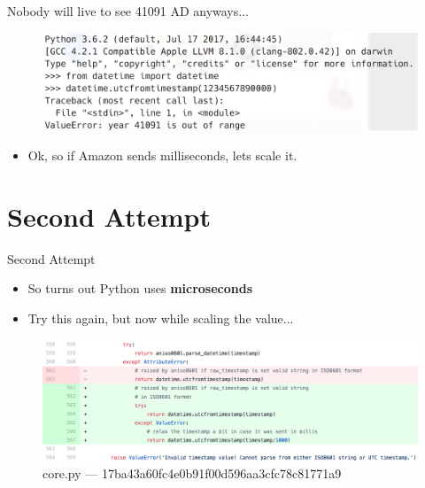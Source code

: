 \documentclass[10pt]{beamer}
\begin{document}
\begin{frame}{Nobody will live to see 41091 AD anyways...}
	\begin{figure}
		\centering
		\includegraphics[width=\textwidth]{images/valueerror.png}
	\end{figure}
	\begin{itemize}
		\item Ok, so if Amazon sends milliseconds, lets scale it.
	\end{itemize}
\end{frame}

\section{Second Attempt}
\begin{frame}{Second Attempt}
	\begin{itemize}
		\item So turns out Python uses \textbf{microseconds}
		\item Try this again, but now while scaling the value...
	\end{itemize}
	\begin{figure}
		\centering
		\includegraphics[width=\textwidth]{images/commit2.png}
		\caption{core.py --- 17ba43a60fc4e0b91f00d596aa3cfc78c81771a9}
	\end{figure}
\end{frame}
\end{document}
